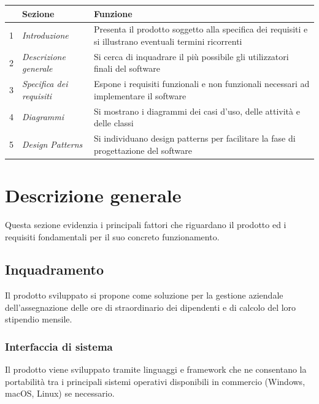 \documentclass{scrreprt}
\begin{document}
\FloatBarrier
\begin{table}[h|]
\centering
\begin{tabular}{|l|l|p{10cm}|}
\hline
 & \textbf{Sezione} & \textbf{Funzione} \\ \hline
1 & \textit{Introduzione} & Presenta il prodotto soggetto alla specifica dei requisiti e si illustrano eventuali termini ricorrenti \\ \hline
2 & \textit{Descrizione generale} & Si cerca di inquadrare il più possibile gli utilizzatori finali del software \\ \hline
3 & \textit{Specifica dei requisiti} & Espone i requisiti funzionali e non funzionali necessari ad implementare il software \\ \hline
4 & \textit{Diagrammi} & Si mostrano i diagrammi dei casi d'uso, delle attività e delle classi \\ \hline
5 & \textit{Design Patterns} & Si individuano design patterns per facilitare la fase di progettazione del software \\ \hline
\end{tabular}
\end{table}
\FloatBarrier


\chapter{Descrizione generale}
Questa sezione evidenzia i principali fattori che riguardano il prodotto ed i requisiti fondamentali per il suo concreto funzionamento.


\section{Inquadramento}
\label{sec:inquadramento}
Il prodotto sviluppato si propone come soluzione per la gestione aziendale dell'assegnazione delle ore di straordinario dei dipendenti e di calcolo del loro stipendio mensile.

	\subsection{Interfaccia di sistema}
	Il prodotto viene sviluppato tramite linguaggi e framework che ne consentano la portabilità tra i principali sistemi operativi disponibili in commercio (Windows, macOS, Linux) se necessario.
\end{document}
